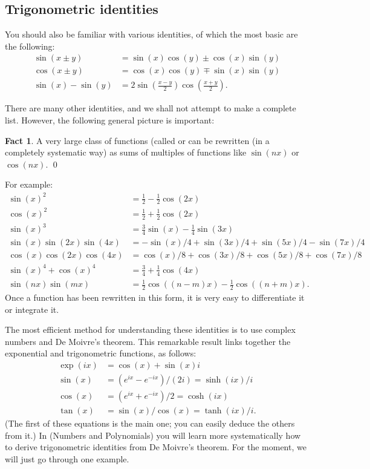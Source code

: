 \documentclass[a4paper]{book}
\theoremstyle{definition}
\newtheorem{fact}[theorem]{Fact}
\begin{document}
\subsection{Trigonometric identities}
\label{subsec-trig-id}

You should also be familiar with various identities, of which the most
basic are the following:
\begin{align*}
 \sin(x\pm y) &= \sin(x)\cos(y) \pm \cos(x)\sin(y) \\
 \cos(x\pm y) &= \cos(x)\cos(y) \mp \sin(x)\sin(y) \\
 \sin(x)-\sin(y) &= 2 \sin\left(\frac{x-y}{2}\right)
                      \cos\left(\frac{x+y}{2}\right).
\end{align*}

There are many other identities, and we shall not attempt to make a
complete list.  However, the following general picture is important:
\begin{fact}
 A very large class of functions (called 
 or  can be rewritten (in a completely
 systematic way) as sums of multiples of functions like $\sin(nx)$ or
 $\cos(nx)$. \qed
\end{fact}
For example:
\begin{align*}
 \sin(x)^2 &= \tfrac{1}{2} - \tfrac{1}{2}\cos(2x) \\
 \cos(x)^2 &= \tfrac{1}{2} + \tfrac{1}{2}\cos(2x) \\
 \sin(x)^3 &= \tfrac{3}{4}\sin(x) - \tfrac{1}{4}\sin(3x) \\
 \sin(x)\sin(2x)\sin(4x)
  &= -\sin(x)/4 + \sin(3x)/4 + \sin(5x)/4 - \sin(7x)/4 \\
 \cos(x)\cos(2x)\cos(4x)
  &= \cos(x)/8 + \cos(3x)/8 + \cos(5x)/8 + \cos(7x)/8 \\
 \sin(x)^4 + \cos(x)^4
  &= \tfrac{3}{4} + \tfrac{1}{4}\cos(4x) \\
 \sin(nx)\sin(mx) &=
  \tfrac{1}{2}\cos((n-m)x) - \tfrac{1}{2}\cos((n+m)x).
\end{align*}
Once a function has been rewritten in this form, it is very easy to
differentiate it or integrate it.

The most efficient method for understanding these identities is to use
complex numbers and De Moivre's theorem.  This remarkable result links
together the exponential and trigonometric functions, as follows:
\begin{align*}
 \exp(ix) &= \cos(x) + \sin(x) i \\
 \sin(x)  &= (e^{ix}-e^{-ix})/(2i) = \sinh(ix)/i \\
 \cos(x)  &= (e^{ix}+e^{-ix})/2 = \cosh(ix) \\
 \tan(x)  &= \sin(x)/\cos(x) = \tanh(ix)/i.
\end{align*}
(The first of these equations is the main one; you can easily deduce
the others from it.)  In  (Numbers and Polynomials) you will
learn more systematically how to derive trigonometric identities from
De Moivre's theorem.  For the moment, we will just go through one
example.
\end{document}
